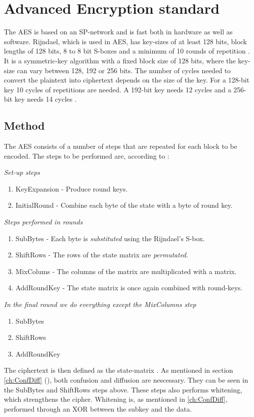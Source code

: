 \chapter{Advanced Encryption standard}
The AES is based on an SP-network and is fast both in hardware as well as 
software. Rijndael, which is used in AES, has key-sizes of at least 128 bits, 
block lengths of 128 bits, 8 to 8 bit S-boxes and a minimum of 10 rounds of 
repetition \citep[p. 79]{Stinson:2006}. It is a symmetric-key algorithm with a 
fixed block size of 128 bits, where the key-size can vary between 128, 192 or 
256 bits. The number of cycles needed to convert the plaintext into ciphertext 
depends on the size of the key. For a 128-bit key 10 cycles of repetitions are 
needed. A 192-bit key needs 12 cycles and a 256-bit key needs 14 cycles 
\citep[p. 103]{Stinson:2006}.

\section{Method}
The AES consists of a number of steps that are repeated for each block to be 
encoded. The steps to be performed are, according to \citet{Stinson:2006}:

\emph{Set-up steps}
\begin{enumerate}
\item KeyExpansion - Produce round keys.
\item InitialRound - Combine each byte of the state with a byte of round key.
\end{enumerate}
\emph{Steps performed in rounds}
\begin{enumerate}
\item SubBytes - Each byte is \emph{substituted} using the Rijndael's S-box.
\item ShiftRows - The rows of the state matrix are \emph{permutated}.
\item MixColums - The columns of the matrix are multiplicated with a matrix.
\item AddRoundKey - The state matrix is once again combined with round-keys.
\end{enumerate}
\emph{In the final round we do everything except the MixColumns step}
\begin{enumerate}
\item SubBytes
\item ShiftRows
\item AddRoundKey
\end{enumerate}

The ciphertext is then defined as the state-matrix \citep[p. 103]{Stinson:2006}. 
As mentioned in section \ref{ch:ConfDiff} (), both 
confusion and diffusion are nescessary. They can be seen in the SubBytes and 
ShiftRows steps above. These steps also performs whitening, which strengthens the cipher. Whitening is, as mentioned in \ref{ch:ConfDiff}, performed through an 
XOR between the subkey and the data.

